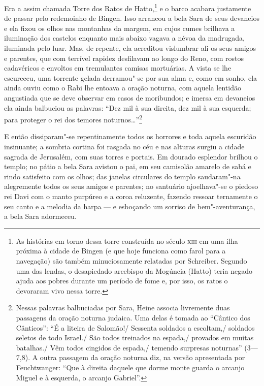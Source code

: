Era a assim chamada Torre dos Ratos de
Hatto,\footnote{ As histórias em torno dessa torre construída no século 
\textsc{xiii} em uma ilha próxima à cidade de Bingen (e que hoje funciona
como farol para a navegação) são também minuciosamente relatadas por Schreiber. Segundo
uma das lendas, o desapiedado arcebispo da Mogúncia (Hatto) teria
negado ajuda aos pobres durante um período de fome e, por isso, os
ratos o devoraram vivo nessa torre.}
e o barco acabara justamente de passar pelo redemoinho de Bingen. Isso
arrancou a bela Sara de seus devaneios e ela fixou os olhos nas
montanhas da margem, em cujos cumes brilhava a iluminação dos castelos
enquanto mais abaixo vagava a névoa da madrugada, iluminada pelo luar.
Mas, de repente, ela acreditou vislumbrar ali os seus amigos e
parentes, que com terrível rapidez desfilavam ao longo do Reno, com
rostos cadavéricos e envoltos em tremulantes camisas mortuárias. A
vista se lhe escureceu, uma torrente gelada derramou"-se por sua alma
e, como em sonho, ela ainda ouviu como o Rabi lhe entoava a oração
noturna, com aquela lentidão angustiada que se deve observar em casos
de moribundos; e imersa em devaneios ela ainda balbuciou as palavras:
``Dez mil à sua direita, dez mil à sua esquerda; para proteger o rei dos
temores
noturnos\ldots''\footnote{ Nessas palavras balbuciadas por Sara, Heine associa livremente duas
passagens da oração noturna judaica. Uma delas é tomada ao ``Cântico dos
Cânticos'': ``É a liteira de Salomão!/ Sessenta soldados a escoltam,/
soldados seletos de todo Israel./ São todos treinados na espada,/
provados em muitas batalhas./ Vêm todos cingidos de espada,/ temendo
surpresas noturnas'' (3---7,8). A outra passagem da oração noturna diz,
na versão apresentada por Feuchtwanger: ``Que à direita daquele que
dorme monte guarda o arcanjo Miguel e à esquerda, o arcanjo Gabriel''.}


E então dissiparam"-se repentinamente todos os horrores e toda aquela
escuridão insinuante; a sombria cortina foi rasgada no céu e nas
alturas surgiu a cidade sagrada de Jerusalém, com suas torres e
portais. Em dourado esplendor brilhou o templo; no pátio a bela Sara
avistou o pai, em seu camisolão amarelo de sabá e rindo satisfeito com
os olhos; das janelas circulares do templo saudaram"-na alegremente
todos os seus amigos e parentes; no santuário ajoelhava"-se o piedoso
rei Davi com o manto purpúreo e a coroa reluzente, fazendo ressoar
ternamente o seu canto e a melodia da harpa --- e esboçando um sorriso de
bem"-aventurança, a bela Sara adormeceu.

